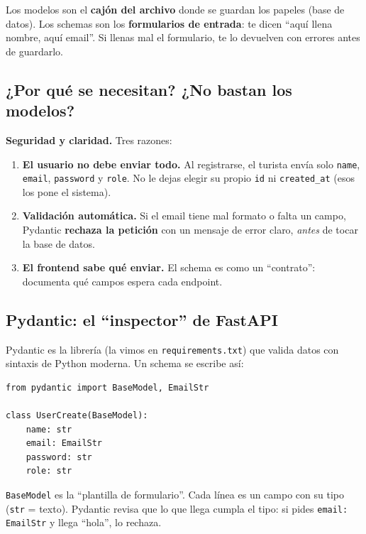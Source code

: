 \documentclass[11pt,a4paper]{article}
\begin{document}
\begin{analogia}
Los modelos son el \textbf{cajón del archivo} donde se guardan los papeles (base de datos).
Los schemas son los \textbf{formularios de entrada}: te dicen ``aquí llena nombre, aquí email''.
Si llenas mal el formulario, te lo devuelven con errores antes de guardarlo.
\end{analogia}

\subsection{¿Por qué se necesitan? ¿No bastan los modelos?}

\textbf{Seguridad y claridad.} Tres razones:

\begin{enumerate}
    \item \textbf{El usuario no debe enviar todo.} Al registrarse, el turista envía solo
    \texttt{name}, \texttt{email}, \texttt{password} y \texttt{role}. No le dejas elegir su
    propio \texttt{id} ni \texttt{created\_at} (esos los pone el sistema).
    \item \textbf{Validación automática.} Si el email tiene mal formato o falta un campo,
    Pydantic \textbf{rechaza la petición} con un mensaje de error claro, \emph{antes} de tocar
    la base de datos.
    \item \textbf{El frontend sabe qué enviar.} El schema es como un ``contrato'': documenta
    qué campos espera cada endpoint.
\end{enumerate}

\subsection{Pydantic: el ``inspector'' de FastAPI}

Pydantic es la librería (la vimos en \texttt{requirements.txt}) que valida datos con sintaxis
de Python moderna. Un schema se escribe así:

\begin{lstlisting}
from pydantic import BaseModel, EmailStr

class UserCreate(BaseModel):
    name: str
    email: EmailStr
    password: str
    role: str
\end{lstlisting}

\texttt{BaseModel} es la ``plantilla de formulario''. Cada línea es un campo con su tipo
(\texttt{str} = texto). Pydantic revisa que lo que llega cumpla el tipo: si pides
\texttt{email: EmailStr} y llega ``hola'', lo rechaza.
\end{document}
